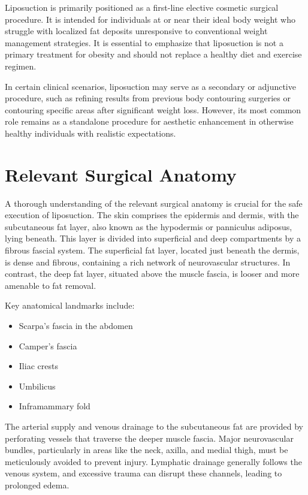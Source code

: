 Liposuction is primarily positioned as a first-line elective cosmetic surgical procedure. It is intended for individuals at or near their ideal body weight who struggle with localized fat deposits unresponsive to conventional weight management strategies. It is essential to emphasize that liposuction is not a primary treatment for obesity and should not replace a healthy diet and exercise regimen. 

In certain clinical scenarios, liposuction may serve as a secondary or adjunctive procedure, such as refining results from previous body contouring surgeries or contouring specific areas after significant weight loss. However, its most common role remains as a standalone procedure for aesthetic enhancement in otherwise healthy individuals with realistic expectations.

\section*{Relevant Surgical Anatomy}
A thorough understanding of the relevant surgical anatomy is crucial for the safe execution of liposuction. The skin comprises the epidermis and dermis, with the subcutaneous fat layer, also known as the hypodermis or panniculus adiposus, lying beneath. This layer is divided into superficial and deep compartments by a fibrous fascial system. The superficial fat layer, located just beneath the dermis, is dense and fibrous, containing a rich network of neurovascular structures. In contrast, the deep fat layer, situated above the muscle fascia, is looser and more amenable to fat removal.

Key anatomical landmarks include:

\begin{itemize}
  \item Scarpa's fascia in the abdomen
  \item Camper's fascia
  \item Iliac crests
  \item Umbilicus
  \item Inframammary fold
\end{itemize}

The arterial supply and venous drainage to the subcutaneous fat are provided by perforating vessels that traverse the deeper muscle fascia. Major neurovascular bundles, particularly in areas like the neck, axilla, and medial thigh, must be meticulously avoided to prevent injury. Lymphatic drainage generally follows the venous system, and excessive trauma can disrupt these channels, leading to prolonged edema.

